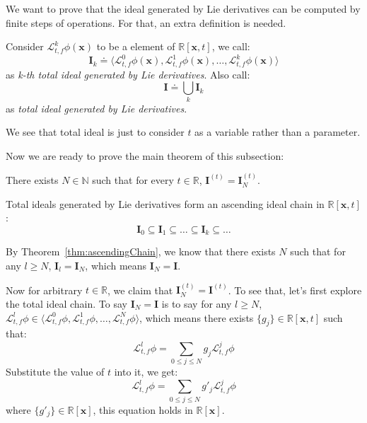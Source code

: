 \documentclass{jssc}
\begin{document}
We want to prove that the ideal generated by Lie derivatives can be computed by finite steps of operations. For that, an extra definition is needed.

\begin{definition}
\label{def:lieTot}
Consider $\mathcal{L}_{t, f}^k \phi(\boldsymbol{x})$ to be a element of $\mathbb{R}[\boldsymbol{x}, t]$, we call:
	\begin{equation*}
		\boldsymbol{I}_k \doteq \langle \mathcal{L}_{t, f}^0 \phi(\boldsymbol{x}), \mathcal{L}_{t, f}^1 \phi(\boldsymbol{x}), \dots, \mathcal{L}_{t, f}^k \phi(\boldsymbol{x}) \rangle
	\end{equation*}	
	as \emph{k-th total ideal generated by Lie derivatives}. Also call:
	\begin{equation*}
		\boldsymbol{I} \doteq \bigcup_k \boldsymbol{I}_k
	\end{equation*}
	as \emph{total ideal generated by Lie derivatives}.
\end{definition}

We see that total ideal is just to consider $t$ as a variable rather than a parameter.

Now we are ready to prove the main theorem of this subsection:
\begin{theorem}
\label{thm:lieIdeal}
There exists $N \in \mathbb{N}$ such that for every $t \in \mathbb{R}$, $\boldsymbol{I}^{(t)} = \boldsymbol{I}_N^{(t)}$.
\end{theorem}

\proof
Total ideals generated by Lie derivatives form an ascending ideal chain in $\mathbb{R}[\boldsymbol{x}, t]$:
\begin{equation*}
	\boldsymbol{I}_0 \subseteq \boldsymbol{I}_1 \subseteq \dots \subseteq \boldsymbol{I}_{k} \subseteq \dots
\end{equation*}

By Theorem~\ref{thm:ascendingChain}, we know that there exists $N$ such that for any $l \geq N$, $\boldsymbol{I}_l = \boldsymbol{I}_N$, which means $\boldsymbol{I}_N = \boldsymbol{I}$.

Now for arbitrary $t \in \mathbb{R}$, we claim that $\boldsymbol{I}_N^{(t)} = \boldsymbol{I}^{(t)}$. To see that, let's first explore the total ideal chain. To say $\boldsymbol{I}_N = \boldsymbol{I}$ is to say for any $l \geq N$, $\mathcal{L}_{t, f}^l \phi  \in \langle \mathcal{L}_{t, f}^0 \phi, \mathcal{L}_{t, f}^1 \phi, \dots, \mathcal{L}_{t, f}^N \phi \rangle$, which means there exists $\{ g_j \} \in \mathbb{R} [\boldsymbol{x}, t]$ such that:
	\begin{equation*}
		\mathcal{L}_{t, f}^l \phi = \sum_{0 \leq j \leq N} g_j \mathcal{L}_{t, f}^j \phi
	\end{equation*}
Substitute the value of $t$ into it, we get:
	\begin{equation*}
		\mathcal{L}_{t, f}^l \phi = \sum_{0 \leq j \leq N} g'_j \mathcal{L}_{t, f}^j \phi
	\end{equation*}
where $\{ g'_j \} \in \mathbb{R} [\boldsymbol{x}]$, this equation holds in $\mathbb{R} [\boldsymbol{x}]$.
\end{document}
